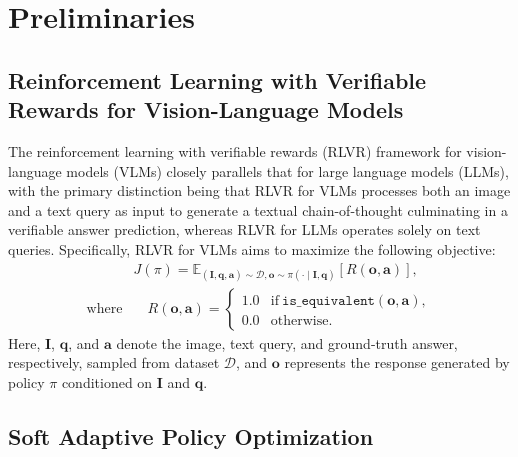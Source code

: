 \section{Preliminaries}




\subsection{Reinforcement Learning with Verifiable Rewards for Vision-Language Models}

The reinforcement learning with verifiable rewards (RLVR) framework for vision-language models (VLMs) closely parallels that for large language models (LLMs), with the primary distinction being that RLVR for VLMs processes both an image and a text query as input to generate a textual chain-of-thought culminating in a verifiable answer prediction, whereas RLVR for LLMs operates solely on text queries.
Specifically, RLVR for VLMs aims to maximize the following objective:
\begin{align}
    &J(\pi) = \mathbb{E}_{(\boldsymbol{I}, \boldsymbol{q}, \boldsymbol{a}) \sim \mathcal{D}, \boldsymbol{o} \sim \pi(\cdot \mid \boldsymbol{I}, \boldsymbol{q})}[R(\boldsymbol{o}, \boldsymbol{a})],
    \\
    \text{where} & \quad  R(\boldsymbol{o}, \boldsymbol{a}) = \begin{cases} 1.0 & \text{if}\ \texttt{is\_equivalent}(\boldsymbol{o}, \boldsymbol{a}), \\ 0.0 & \text{otherwise.} \end{cases} \label{eq: reward calculation}
\end{align}
Here, $\boldsymbol{I}$, $\boldsymbol{q}$, and $\boldsymbol{a}$ denote the image, text query, and ground-truth answer, respectively, sampled from dataset $\mathcal{D}$, and $\boldsymbol{o}$ represents the response generated by policy $\pi$ conditioned on $\boldsymbol{I}$ and $\boldsymbol{q}$.




\subsection{Soft Adaptive Policy Optimization}


